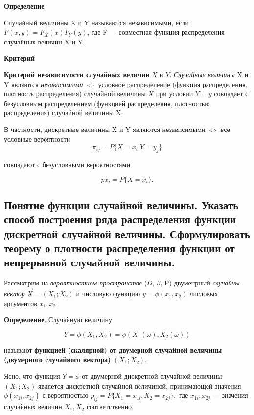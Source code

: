 \textbf{Определение}

Случайный величины X и Y называются независимыми, если $F(x, y) = F_X(x)F_Y(y)$, где F --- совместная функция распределения случайных величин X и Y.

\textbf{Критерий}

\textbf{Критерий независимости случайных величин} $X$ и $Y$. \textit{Случайные величины} X и Y являются \textit{независимыми} $\Leftrightarrow$ условное распределение (функция распределения,
плотность распределения) случайной величины $X$ при условии $Y = y$ совпадает с безусловным распределением (функцией распределения, плотностью распределения) случайной величины X.

В частности, дискретные величины X и Y являются независимыми $\Leftrightarrow$ все условные вероятности
\begin{equation}
	\pi_{ij} = P\{X = x_i |Y = y_j\}
\end{equation}

совпадают с безусловными вероятностями 

\begin{equation}
	px_i = P\{X = x_i\}.
\end{equation}


\subsection{Понятие функции случайной величины. Указать способ построения ряда распределения функции дискретной случайной величины. Сформулировать теорему о плотности распределения функции от непрерывной случайной величины.}

Рассмотрим на \textit{вероятностном пространстве} ($\Omega$, $\beta$, P) двуменрный \textit{случайны вектор} $\overrightarrow{X} = (X_1; X_2)$ и числовую функцию $y = \phi(x_1, x_2)$ числовых аргументов $x_1, x_2$

\textbf{Определение}. Случайную величину

\begin{equation}
	Y = \phi(X_1, X_2) = \phi(X_1(\omega), X_2(\omega))
\end{equation}

называют \textbf{функцией (скалярной) от двумерной случайной величины (двумерного случайного вектора)} $(X_1;X_2)$.

Ясно, что функция $Y = \phi$ от двумерной дискретной случайной величины $(X_1;X_2)$ является дискретной случайной величиной, принимающей значения $\phi (x_{1i}, x_{2j})$ с вероятностью $p_{ij} = P\{X_1 = x_{1i}, X_2 = x_{2j}\}, $ где $x_{1i}, x_{2j}$ --- значения случайных величин $X_1, X_2$ соответственно.

